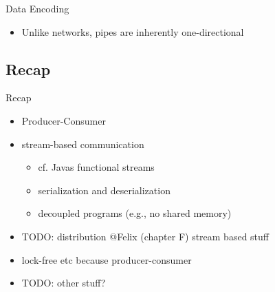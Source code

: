 {\begin{frame}[fragile]{Data Encoding}
\begin{itemize}[<+(1)->]
\begin{verbatim}
\end{verbatim}
      \item Unlike networks, pipes are inherently one-directional
   \end{itemize}
\end{frame}
}

\subsection{Recap} %
\begin{frame}{Recap}
   \begin{itemize}[<+(1)->]
      \itemsep12pt
      \item Producer-Consumer
      \item stream-based communication \begin{itemize}
         \item cf. Javas functional streams
         \item serialization and deserialization %
         \item decoupled programs (e.g., no shared memory)
      \end{itemize}
      \item TODO: distribution @Felix (chapter F) stream based stuff
      \item lock-free etc because producer-consumer
      \item TODO: other stuff?
   \end{itemize}
\end{frame}

